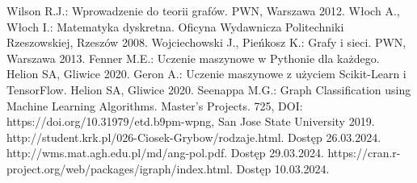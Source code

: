 
\begin{thebibliography}{4}
 Wilson R.J.: Wprowadzenie do teorii grafów. PWN, Warszawa 2012.
 Włoch A., Włoch I.: Matematyka dyskretna. Oficyna Wydawnicza Politechniki Rzeszowskiej, Rzeszów 2008.
 Wojciechowski J., Pieńkosz K.: Grafy i sieci. PWN, Warszawa 2013.
 Fenner M.E.: Uczenie maszynowe w Pythonie dla każdego. Helion SA, Gliwice 2020.
 Geron A.: Uczenie maszynowe z użyciem Scikit-Learn i TensorFlow. Helion SA, Gliwice 2020.
 Seenappa M.G.: Graph Classification using Machine Learning Algorithms. Master's Projects. 725, DOI: https://doi.org/10.31979/etd.b9pm-wpng, San Jose State University 2019.
 http://student.krk.pl/026-Ciosek-Grybow/rodzaje.html. Dostęp 26.03.2024.
 http://wms.mat.agh.edu.pl/\texttildelow md/ang-pol.pdf. Dostęp 29.03.2024. 
 https://cran.r-project.org/web/packages/igraph/index.html. Dostęp 10.03.2024.
\end{thebibliography}